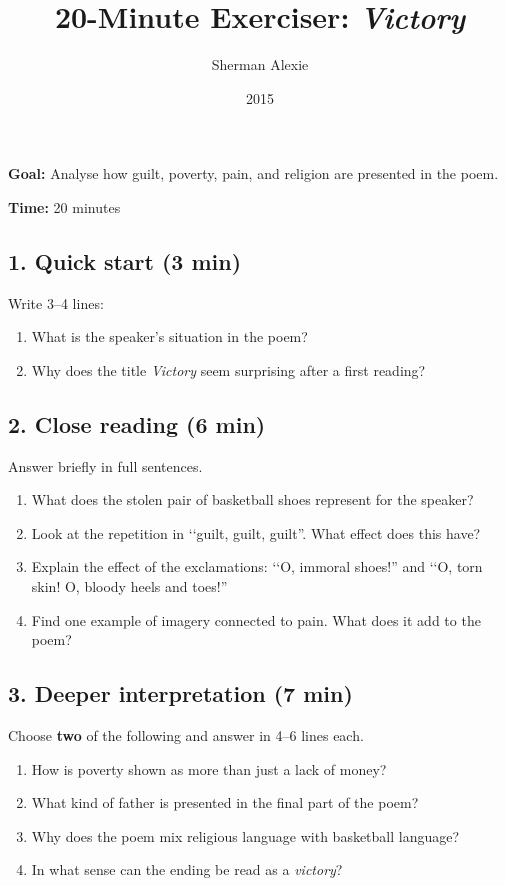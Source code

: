 \documentclass[10pt,a4paper]{article}
\newcommand{\qm}[1]{‘‘#1”}
\begin{document}
\title{20-Minute Exerciser: \textit{Victory}}
\date{2015}
\author{Sherman Alexie}
\maketitle
    
\thispagestyle{plain}
\setcounter{page}{1}
\linenumbers

\textbf{Goal:} Analyse how guilt, poverty, pain, and religion are presented in the poem.

\textbf{Time:} 20 minutes

\subsection{1. Quick start (3 min)}
Write 3--4 lines:
\begin{enumerate}
    \item What is the speaker's situation in the poem?
    \item Why does the title \textit{Victory} seem surprising after a first reading?
\end{enumerate}

\subsection{2. Close reading (6 min)}
Answer briefly in full sentences.
\begin{enumerate}
    \item What does the stolen pair of basketball shoes represent for the speaker?
    \item Look at the repetition in \qm{guilt, guilt, guilt}. What effect does this have?
    \item Explain the effect of the exclamations: \qm{O, immoral shoes!} and \qm{O, torn skin! O, bloody heels and toes!}
    \item Find one example of imagery connected to pain. What does it add to the poem?
\end{enumerate}

\subsection{3. Deeper interpretation (7 min)}
Choose \textbf{two} of the following and answer in 4--6 lines each.
\begin{enumerate}
    \item How is poverty shown as more than just a lack of money?
    \item What kind of father is presented in the final part of the poem?
    \item Why does the poem mix religious language with basketball language?
    \item In what sense can the ending be read as a \textit{victory}?
\end{enumerate}
\end{document}
